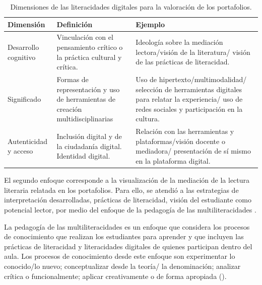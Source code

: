 \begin{table}[!htpb]
\centering
\begin{threeparttable}
\caption{Dimensiones de las literacidades digitales para la valoración de los portafolios.}
\label{tab-02}
\begin{tabular}{p{3cm} p{4cm} p{5cm} }
\toprule
Dimensión & Definición & Ejemplo \\
\midrule
Desarrollo cognitivo \cite{gillen_barton_2010} & Vinculación con el pensamiento crítico o la práctica cultural y crítica. & Ideología sobre la mediación lectora/visión de la literatura/ visión de las prácticas de literacidad. \\
Significado \cite{hafner_chik_jones_2015} & Formas de representación y uso de herramientas de creación multidisciplinarias & Uso de hipertexto/multi\-mo\-da\-li\-dad/ selección de herramientas digitales para relatar la experiencia/ uso de redes sociales y participación en la cultura. \\
Autenticidad y acceso \cite{gillen_barton_2010} & Inclusión digital y de la ciudadanía digital. Identidad digital. & Relación con las herramientas y plataformas/visión docente o mediadora/ presentación de sí mismo en la plataforma digital. \\
\bottomrule
\end{tabular}
\end{threeparttable}
\end{table}
	
El segundo enfoque corresponde a la visualización de la mediación de la
lectura literaria relatada en los portafolios. Para ello, se atendió a
las estrategias de interpretación desarrolladas, prácticas de
literacidad, visión del estudiante como potencial lector, por medio del
enfoque de la pedagogía de las multiliteracidades \cite{kalantzis2019,Kalantzis2023}.

La pedagogía de las multiliteracidades es un enfoque que considera los
procesos de conocimiento que realizan los estudiantes para aprender y
que incluyen las prácticas de literacidad y literacidades digitales de
quienes participan dentro del aula. Los procesos de conocimiento desde
este enfoque son experimentar lo conocido/lo nuevo; conceptualizar desde
la teoría/ la denominación; analizar crítica o funcionalmente; aplicar
creativamente o de forma apropiada ().

